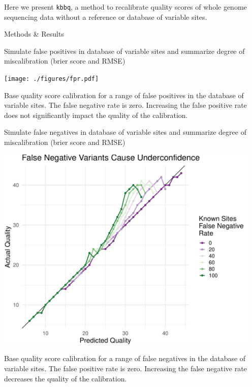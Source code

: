 \documentclass{article}
\begin{document}
\begin{outline}
\begin{outline}
		\item Here we present \texttt{kbbq}, a method to recalibrate quality scores of whole genome sequencing data without a reference or database of variable sites.
	\end{outline}
	\item Methods \& Results
	\begin{outline}
		\item Simulate false positives in database of variable sites and summarize degree of miscalibration (brier score and RMSE)
		\begin{outline}
			\item \texttt{[image: ./figures/fpr.pdf]}
			\item Base quality score calibration for a range of false positives in the database of variable sites. The false negative rate is zero. Increasing the false positive rate does not significantly impact the quality of the calibration.
		\end{outline}
		\item Simulate false negatives in database of variable sites and summarize degree of miscalibration (brier score and RMSE)
		\begin{outline}
			\item \includegraphics[width=5in]{./figures/fnr.pdf}
			\item Base quality score calibration for a range of false negatives in the database of variable sites. The false positive rate is zero. Increasing the false negative rate decreases the quality of the calibration.

\end{outline}
\end{outline}
\end{outline}
\end{document}
